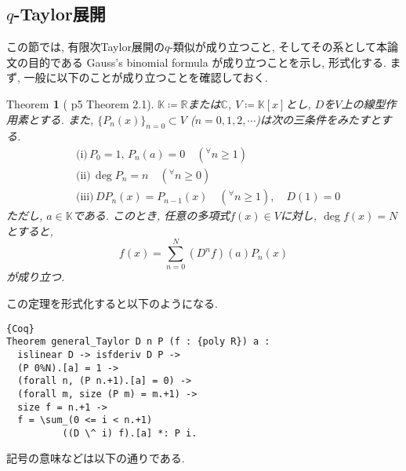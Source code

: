 \documentclass[11pt]{jarticle}
\theoremstyle{mystyle}
\newtheorem{thm}[df]{$\textrm{Theorem}$}
\newcommand{\bthm}{\begin{shadebox} \begin{thm}}
\newcommand{\ethm}{\end{thm} \end{shadebox}}
\newcommand{\bpf}{\begin{proof}}
\newcommand{\epf}{\end{proof}}
\newcommand{\R}{\mathbb{R}}
\newcommand{\C}{\mathbb{C}}
\newcommand{\K}{\mathbb{K}}
\newcommand{\0}{\textbf{0}}
\newcommand{\1}{\textbf{1}}
\newcommand{\2}{\textbf{2}}
\begin{document}
\subsection{$q$-Taylor展開} \label{sssec q_Taylor}
この節では, 有限次Taylor展開の$q$-類似が成り立つこと, そしてその系として本論文の目的である Gauss's binomial formula が成り立つことを示し, 形式化する. 
まず, 一般に以下のことが成り立つことを確認しておく. 
\bthm[\cite{Kac} p5 Theorem 2.1] \label{general_Taylor}
$\K\coloneqq\R$または$\C$, $V\coloneqq\K[x]$とし, $D$を$V$上の線型作用素とする. また, 
$\{P_n(x)\}_{n=0}\subset V$ ($n=0,1,2,\cdots$)は次の三条件をみたすとする. 
  \begin{align*}
    &\textrm{(i)}\,P_0 = 1,\,P_n(a)=0 \quad ({}^{\forall}n\ge1)\\
    &\textrm{(ii)}\,\deg P_n = n \quad ({}^{\forall}n\ge0)\\
    &\textrm{(iii)}\,DP_n(x) = P_{n-1}(x) \quad ({}^{\forall}n\ge1), \quad D(1) = 0
  \end{align*}
ただし, $a\in\K$である. このとき, 任意の多項式$f(x)\in V$に対し, $\deg f(x)=N$とすると, 
  \[
    f(x) = \sum_{n=0}^N(D^nf)(a)P_n(x)
  \]
が成り立つ. 
\ethm
この定理を形式化すると以下のようになる. 
\begin{lstlisting}{Coq}
Theorem general_Taylor D n P (f : {poly R}) a :
  islinear D -> isfderiv D P ->
  (P 0%N).[a] = 1 ->
  (forall n, (P n.+1).[a] = 0) ->
  (forall m, size (P m) = m.+1) ->
  size f = n.+1 ->
  f = \sum_(0 <= i < n.+1)
          ((D \^ i) f).[a] *: P i. \end{lstlisting}
記号の意味などは以下の通りである. 
\end{document}
